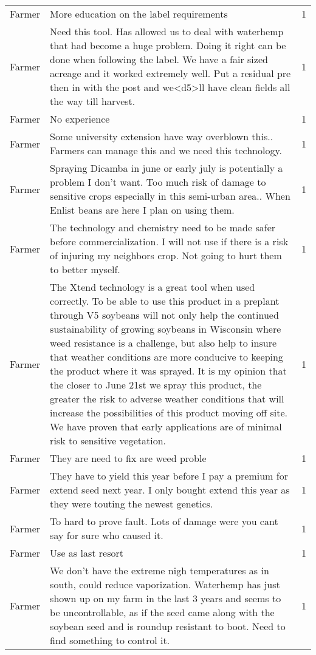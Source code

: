 \documentclass[]{article}
\begin{document}
\begin{table}[H]
\begin{tabular}{llr}
Farmer & More education on the label requirements & 1\\
Farmer & Need this tool. Has allowed us to deal with waterhemp that had become a huge problem. Doing it right can be done when following the label. We have a fair sized acreage and it worked extremely well. Put a residual pre then in with the post and we<d5>ll have clean fields all the way till harvest. & 1\\
Farmer & No experience & 1\\
\addlinespace
Farmer & Some university extension have way overblown this..  Farmers can manage this and we need this technology. & 1\\
Farmer & Spraying Dicamba in june or early july is potentially a problem I don't want.  Too much risk of  damage to sensitive crops especially in this semi-urban area.. When Enlist beans are here I plan on using them. & 1\\
Farmer & The technology and chemistry need to be made safer before commercialization. I will not use if there is a risk of injuring my neighbors crop. Not going to hurt them to better myself. & 1\\
Farmer & The Xtend technology is a great tool when used correctly. To be able to use this product in a preplant through V5 soybeans will not only help the continued sustainability of growing soybeans in Wisconsin where weed resistance is a challenge, but also help to insure that weather conditions are more conducive to keeping the product where it was sprayed.  It is my opinion that the closer to June 21st we spray this product, the greater the risk to adverse weather conditions that will increase the possibilities of this product moving off site. We have proven that early applications are of minimal risk to sensitive vegetation. & 1\\
Farmer & They are need to fix are weed proble & 1\\
\addlinespace
Farmer & They have to yield this year before I pay a premium for extend seed next year. I only bought extend this year as they were touting the newest genetics. & 1\\
Farmer & To hard to prove fault.  Lots of damage were you cant say for sure who caused it. & 1\\
Farmer & Use as last resort & 1\\
Farmer & We don't have the extreme nigh temperatures as in south, could reduce vaporization.  Waterhemp has just shown up on my farm in the last 3 years and seems to be uncontrollable, as if the seed came along with the soybean seed and is roundup resistant to boot.  Need to find something to control it. & 1\\

\end{tabular}
\end{table}
\end{document}
